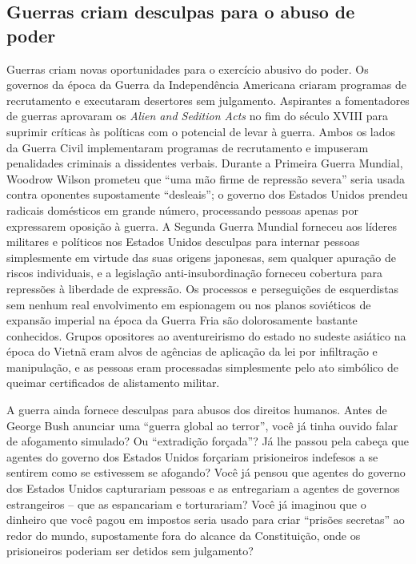 \subsection*{Guerras criam desculpas para o abuso de poder}

Guerras criam novas oportunidades para o exercício abusivo do poder. Os governos da época da Guerra da Independência Americana criaram programas de recrutamento e executaram desertores sem julgamento. Aspirantes a fomentadores de guerras aprovaram os \emph{Alien and Sedition Acts} no fim do século XVIII para suprimir críticas às políticas com o potencial de levar à guerra. Ambos os lados da Guerra Civil implementaram programas de recrutamento e impuseram penalidades criminais a dissidentes verbais. Durante a Primeira Guerra Mundial, Woodrow Wilson prometeu que ``uma mão firme de repressão severa'' seria usada contra oponentes supostamente ``desleais''; o governo dos Estados Unidos prendeu radicais domésticos em grande número, processando pessoas apenas por expressarem oposição à guerra. A Segunda Guerra Mundial forneceu aos líderes militares e políticos nos Estados Unidos desculpas para internar pessoas simplesmente em virtude das suas origens japonesas, sem qualquer apuração de riscos individuais, e a legislação anti-insubordinação forneceu cobertura para repressões à liberdade de expressão. Os processos e perseguições de esquerdistas sem nenhum real envolvimento em espionagem ou nos planos soviéticos de expansão imperial na época da Guerra Fria são dolorosamente bastante conhecidos. Grupos opositores ao aventureirismo do estado no sudeste asiático na época do Vietnã eram alvos de agências de aplicação da lei por infiltração e manipulação, e as pessoas eram processadas simplesmente pelo ato simbólico de queimar certificados de alistamento militar.

A guerra ainda fornece desculpas para abusos dos direitos humanos. Antes de George Bush anunciar uma ``guerra global ao terror'', você já tinha ouvido falar de afogamento simulado? Ou ``extradição forçada''? Já lhe passou pela cabeça que agentes do governo dos Estados Unidos forçariam prisioneiros indefesos a se sentirem como se estivessem se afogando? Você já pensou que agentes do governo dos Estados Unidos capturariam pessoas e as entregariam a agentes de governos estrangeiros -- que as espancariam e torturariam? Você já imaginou que o dinheiro que você pagou em impostos seria usado para criar ``prisões secretas'' ao redor do mundo, supostamente fora do alcance da Constituição, onde os prisioneiros poderiam ser detidos sem julgamento?

